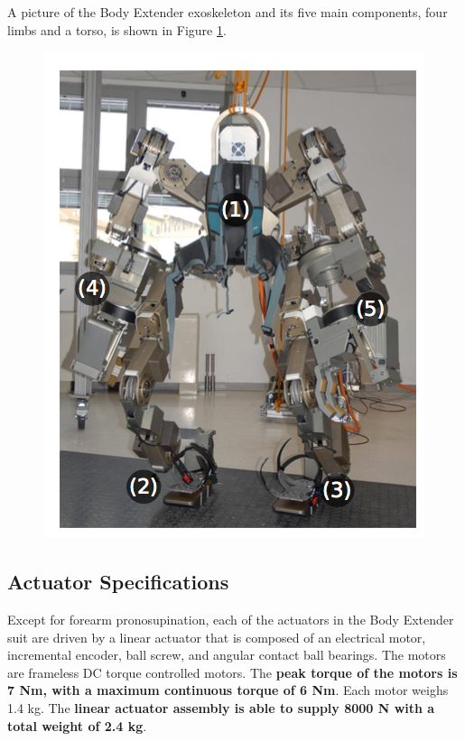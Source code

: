 A picture of the Body Extender exoskeleton and its five main components, four limbs and a torso, is shown in Figure \ref{fig:bodyExt}.
\begin{figure}[thpb]
\centering
\includegraphics[width=3.in]{exos/figs/bodyExt/bodyExt}
  \caption{}
  \vspace{-0.2in}
 \label{fig:bodyExt}   
 \end{figure}

\subsection{Actuator Specifications}
 
 Except for forearm pronosupination, each of the actuators in the Body Extender suit are driven by a linear actuator that is composed of an electrical motor, incremental encoder, ball screw, and angular contact ball bearings.  The motors are frameless DC torque controlled motors.  The {\bf peak torque of the motors is 7 Nm, with a maximum continuous torque of 6 Nm}.  Each motor weighs 1.4 kg.  The {\bf linear actuator assembly is able to supply 8000 N with a total weight of 2.4 kg}.
 
